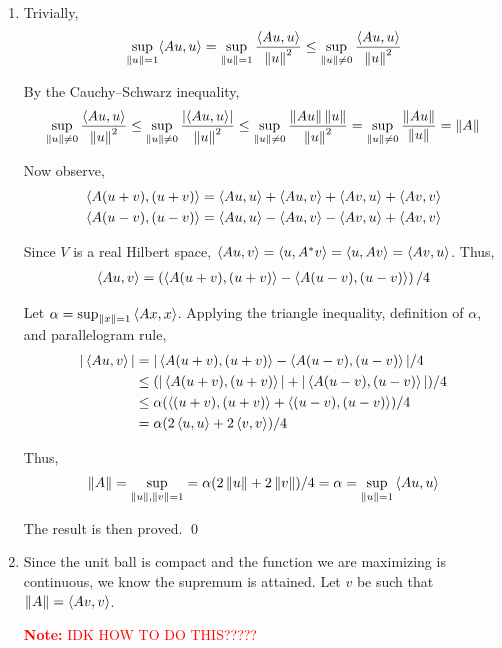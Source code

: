 \documentclass[10pt]{article}
\newcommand{\note}[1]{\textcolor{red}{\textbf{Note:} #1}}
\begin{document}
\begin{solution}[Solution]
\begin{enumerate}[label=(\alph*)]
    \item
    Trivially,
    \begin{align*}
        \sup_{\left\lVert u\right\rVert = 1} \langle Au,u \rangle
        = \sup_{\left\lVert u\right\rVert = 1} \dfrac{ \langle Au,u \rangle}{ \left\lVert u\right\rVert^2}
        \leq \sup_{\left\lVert u\right\rVert \neq 0} \dfrac{ \langle Au,u \rangle}{ \left\lVert u\right\rVert^2}
    \end{align*}

    By the Cauchy--Schwarz inequality,
    \begin{align*}
        \sup_{\left\lVert u\right\rVert\neq 0} \dfrac{ \langle Au,u \rangle}{ \left\lVert u\right\rVert^2}
        \leq \sup_{\left\lVert u\right\rVert \neq 0} \dfrac{ |\langle Au,u \rangle|}{ \left\lVert u\right\rVert^2}
        \leq \sup_{\left\lVert u\right\rVert \neq 0} \dfrac{ \left\lVert Au\right\rVert\left\lVert u\right\rVert}{ \left\lVert u\right\rVert^2}
        = \sup_{\left\lVert u\right\rVert \neq 0} \dfrac{ \left\lVert Au\right\rVert}{ \left\lVert u\right\rVert}
        = \left\lVert A\right\rVert
    \end{align*}

    Now observe,
    \begin{align*}
    \left\langle A(u+v),(u+v) \right\rangle = \left\langle Au,u \right\rangle + \left\langle Au,v \right\rangle + \left\langle Av,u \right\rangle + \left\langle Av,v \right\rangle \\
    \left\langle A(u-v),(u-v) \right\rangle = \left\langle Au,u \right\rangle - \left\langle Au,v \right\rangle - \left\langle Av,u \right\rangle + \left\langle Av,v \right\rangle
    \end{align*}

    Since \( V \) is a real Hilbert space, \( \left\langle Au,v \right\rangle = \left\langle u,A^*v \right\rangle = \left\langle u,Av \right\rangle = \left\langle Av,u \right\rangle \). Thus,
    \begin{align*}
        \left\langle Au,v \right\rangle = \left( \left\langle A(u+v),(u+v) \right\rangle - \left\langle A(u-v),(u-v) \right\rangle \right) / 4
    \end{align*}

    Let \( \alpha = \sup_{\left\lVert x\right\rVert=1} \left\langle Ax,x \right\rangle  \). Applying the triangle inequality, definition of \( \alpha \), and parallelogram rule,
    \begin{align*}
        |\left\langle Au,v \right\rangle| &= |\left\langle A(u+v),(u+v) \right\rangle - \left\langle A(u-v),(u-v) \right\rangle| / 4 \\
        &\leq (|\left\langle A(u+v),(u+v) \right\rangle| + |\left\langle A(u-v),(u-v) \right\rangle|) / 4 \\
        &\leq \alpha(\left\langle (u+v),(u+v) \right\rangle + \left\langle (u-v),(u-v) \right\rangle) / 4 \\
        &= \alpha( 2\left\langle u,u \right\rangle + 2\left\langle v,v \right\rangle ) / 4
    \end{align*}

    Thus,
    \begin{align*}
        \left\lVert A\right\rVert = \sup_{\left\lVert u\right\rVert,\left\lVert v\right\rVert = 1} = \alpha( 2\left\lVert u\right\rVert + 2\left\lVert v\right\rVert ) / 4 = \alpha = \sup_{\left\lVert u\right\rVert=1} \left\langle Au,u \right\rangle
    \end{align*}

    The result is then proved. \qed

    \item Since the unit ball is compact and the function we are maximizing is continuous, we know the supremum is attained. Let \( v \) be such that \( \left\lVert A\right\rVert = \langle Av, v\rangle \).


    \note{IDK HOW TO DO THIS?????}


\end{enumerate}
\end{solution}
\end{document}
